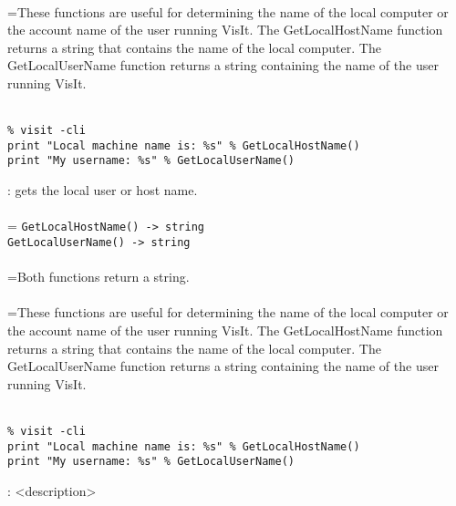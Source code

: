 \documentclass[10pt,a4paper]{report}
\begin{document}
 \\ 
\hangindent=\parindent These functions are useful for determining the name of the local computer or the account name of the user running VisIt. The GetLocalHostName function returns a string that contains the name of the local computer. The GetLocalUserName function returns a string containing the name of the user running VisIt. \\[-3mm] 

\\[-6mm]
\begin{verbatim}% visit -cli
print "Local machine name is: %s" % GetLocalHostName()
print "My username: %s" % GetLocalUserName()
\end{verbatim}
\newpage


{}
: gets the local user or host name.\\[-3mm]

 \\ 
\hangindent=\parindent 
\verb!GetLocalHostName() -> string!\\ 
\verb!GetLocalUserName() -> string!\\ [-3mm]

 \\ 
\hangindent=\parindent Both functions return a string. \\[-3mm] 

 \\ 
\hangindent=\parindent These functions are useful for determining the name of the local computer or the account name of the user running VisIt. The GetLocalHostName function returns a string that contains the name of the local computer. The GetLocalUserName function returns a string containing the name of the user running VisIt. \\[-3mm] 

\\[-6mm]
\begin{verbatim}% visit -cli
print "Local machine name is: %s" % GetLocalHostName()
print "My username: %s" % GetLocalUserName()
\end{verbatim}
\newpage


{}
: <description>\\[-3mm]
\end{document}
